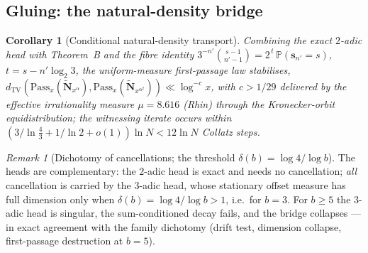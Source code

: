 \documentclass[12pt,a4paper]{article}
\newtheorem{corollary}[theorem]{Corollary}
\theoremstyle{remark}
\newtheorem{remark}[theorem]{Remark}
\begin{document}
\subsection{Gluing: the natural-density bridge}
\begin{corollary}[Conditional natural-density transport]
Combining the exact $2$-adic head with Theorem~B and the fibre identity
$3^{-n'}\binom{s-1}{n'-1}=2^{\,t}\,\mathbb P(\mathbf s_{n'}=s)$,
$t=s-n'\log_2 3$, the uniform-measure first-passage law stabilises,
$d_{\mathrm{TV}}(\mathrm{Pass}_x(\widetilde{\mathbf N}_{x^\alpha}),
\mathrm{Pass}_x(\widetilde{\mathbf N}_{x^{\alpha^2}}))\ll\log^{-c}x$,
with $c>1/29$ delivered by the effective irrationality measure $\mu=8.616$
(Rhin) through the Kronecker-orbit equidistribution; the witnessing iterate
occurs within $(3/\ln\frac43+1/\ln2+o(1))\ln N<12\ln N$ Collatz steps.
\end{corollary}
\begin{remark}[Dichotomy of cancellations; the threshold $\delta(b)=\log4/\log b$]
The heads are complementary: the $2$-adic head is exact and needs no
cancellation; \emph{all} cancellation is carried by the $3$-adic head, whose
stationary offset measure has full dimension only when
$\delta(b)=\log4/\log b>1$, i.e.\ for $b=3$. For $b\ge5$ the $3$-adic head is
singular, the sum-conditioned decay fails, and the bridge collapses --- in
exact agreement with the family dichotomy (drift test, dimension collapse,
first-passage destruction at $b=5$).
\end{remark}
\end{document}
